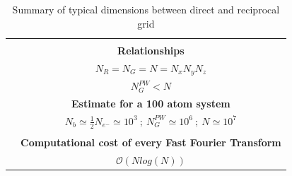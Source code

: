 \documentclass[8pt]{beamer}
\begin{document}
\begin{frame}
\begin{table}[]
\begin{tabular}{lc}
                                    & \multicolumn{1}{l}{}                                                                                                                                             \\ \cline{2-2} 
\multicolumn{1}{l|}{}               & \multicolumn{1}{c|}{\textbf{Relationships}}                                                                                                                      \\ \cline{2-2} 
\multicolumn{1}{l|}{}               & \multicolumn{1}{c|}{$N_{R} = N_{G} = N = N_x N_y N_z$}                                                                                                                         \\ \cline{2-2} 
\multicolumn{1}{l|}{}               & \multicolumn{1}{c|}{$N_{G}^{PW} < N$}                                                                                                                       \\ \cline{2-2} 
\multicolumn{1}{l|}{}               & \multicolumn{1}{c|}{\textbf{Estimate for a 100 atom system}}                                                                                                                       \\ \cline{2-2} 
\multicolumn{1}{l|}{}               & \multicolumn{1}{c|}{ $N_{b} \simeq \frac{1}{2} N_{e^{-}} \simeq 10^3~;~ N_{G}^{PW} \simeq 10^{6} ~;~ N \simeq 10^7 $}                                                                                                                       \\ \cline{2-2} 
                                    &                                                                                                                                                                  \\ \cline{2-2} 
\multicolumn{1}{l|}{}               & \multicolumn{1}{c|}{\textbf{Computational cost of every Fast Fourier Transform}}                                                                                           \\ \cline{2-2} 
\multicolumn{1}{l|}{}               & \multicolumn{1}{c|}{$\mathcal{O}(N log (N))$}                                                                                                                    \\ \cline{2-2} 
\end{tabular}
\caption{Summary of typical dimensions between direct and reciprocal grid}
\label{tab:FFTSummary}
\end{table}

\end{frame}
\end{document}
